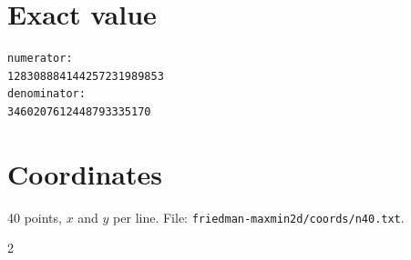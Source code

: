 \documentclass[11pt,a4paper]{article}
\begin{document}
\appendix
\section{Exact value}
{\small
\begin{verbatim}
numerator:
128308884144257231989853
denominator:
3460207612448793335170
\end{verbatim}}

\section{Coordinates}
40 points, $x$ and $y$ per line. File: \texttt{friedman-maxmin2d/coords/n40.txt}.
{\tiny
\begin{multicols}{2}
\end{multicols}}
\end{document}
